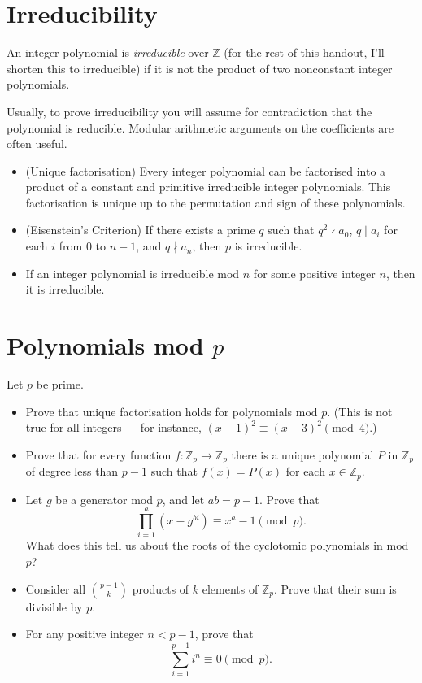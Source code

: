\documentclass{article}
\newcommand\Zz{\mathbb{Z}}
\begin{document}
\section{Irreducibility}
An integer polynomial is \emph{irreducible} over $\mathbb Z$ (for the rest of
this handout, I'll shorten this to irreducible) if it is not the product of two
nonconstant integer polynomials.

Usually, to prove irreducibility you will assume for contradiction that the
polynomial is reducible. Modular arithmetic arguments on the coefficients are
often useful.
\begin{itemize}
	\item (Unique factorisation) Every integer polynomial can be factorised into a
	      product of a constant and primitive irreducible integer
	      polynomials. This factorisation is unique up to the permutation and sign of
	      these polynomials.
	\item (Eisenstein's Criterion) If there exists a prime $q$ such that $q^2\nmid
		      a_0$, $q\mid a_i$ for each $i$ from $0$ to $n-1$, and $q\nmid a_n$, then $p$
	      is irreducible.
	\item If an integer polynomial is irreducible mod $n$ for some positive integer
	      $n$, then it is irreducible.
\end{itemize}
\section{Polynomials mod $p$}
Let $p$ be prime.
\begin{itemize}
	\item Prove that unique factorisation holds for polynomials mod $p$. (This is
	      not true for all integers --- for instance,
	      $(x-1)^2\equiv(x-3)^2\pmod 4$.)
	\item Prove that for every function $f:\Zz_p\to\Zz_p$ there is a unique polynomial $P$ in
	      $\Zz_p$ of degree less than $p-1$ such that $f(x)=P(x)$ for each
	      $x\in\Zz_p$.
	\item Let $g$ be a generator mod $p$, and let $ab=p-1$. Prove that
	      \[\prod_{i=1}^a (x-g^{bi})\equiv x^a-1\pmod p.\]
	      What does this tell us about the roots of the cyclotomic polynomials in mod
	      $p$?
	\item Consider all $\binom{p-1}k$ products of $k$ elements of $\Zz_p$. Prove
	      that their sum is divisible by $p$.
	\item For any positive integer $n<p-1$, prove that
	      \[\sum_{i=1}^{p-1} i^n\equiv 0\pmod p.\]
\end{itemize}
\end{document}
